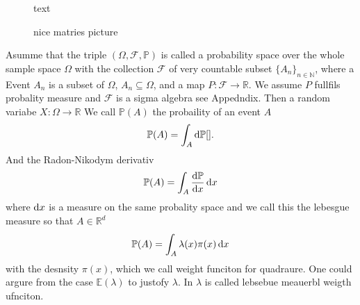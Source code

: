 \begin{figure}[ht!]
	\centering
{} 
\caption{text}
\label{fig:TTtikz}
\end{figure}
\begin{figure}[ht!]
	\centering

	\caption{nice matries picture \cite{fox2021grid}}
	\label{fig:TTdraw}
	
\end{figure}

Asumme that the triple $(\Omega, \mathcal{F} , \mathbb{P})$ is called a probability space over the whole sample space $\Omega$ with the collection $\mathcal{F}$ of very countable subset $\{ A _n \}_{n\in \mathbb{N}}$, where a Event $A_n$ is a subset of $\Omega$, $A_n \subseteq  \Omega$, and a map $P : \mathcal{F} \longrightarrow \mathbb{R}$. 
We assume $P$ fullfils probality measure and  $\mathcal{F}$ is a sigma algebra see Appedndix.
Then a random variabe $X: \Omega \longrightarrow \mathbb{R} $
We call $\mathbb{P}(A)$ the probaility of an event $A$ 
\begin{align}
	\mathbb{P}(A) = \int_A \mathop{}\!\mathrm{d} \mathbb{P} \text{\cite{}}.
\end{align}
And the Radon-Nikodym  derivativ
\begin{align}
	\mathbb{P}(A) = \int_{A}  \frac{\mathop{}\!\mathrm{d} \mathbb{P}}{\mathop{}\!\mathrm{d} x} \mathop{}\!\mathrm{d} x
\end{align}
where $\mathop{}\!\mathrm{d} x$ is a measure on the same probality space and we call this the lebesgue measure so that $A \in \mathbb{R}^d$
\begin{align}
	\mathbb{P}(A) = \int_{A} \lambda(x)   \pi(x) \mathop{}\!\mathrm{d} x
\end{align}
with the desnsity $\pi(x)$, which we call weight funciton for quadraure.
One could argure from the case $\mathbb{E}(\lambda)$ to justofy $\lambda$.
In \cite{cui2022deep} $\lambda$ is called lebsebue meauerbl weigth ufnciton.
 
